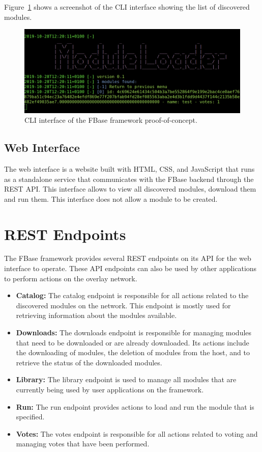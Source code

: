 Figure~\ref{fig:cli-interface} shows a screenshot of the CLI interface showing the list of discovered modules.

\begin{figure}[h!]
	\centering
	\includegraphics[width=\textwidth]{images/cli-interface.png}
	\caption{\label{fig:cli-interface} CLI interface of the FBase framework proof-of-concept.}
\end{figure}

\subsection{Web Interface}

The web interface is a website built with HTML, CSS, and JavaScript that runs as a standalone service that communicates with the FBase backend through the REST API. This interface allows to view all discovered modules, download them and run them. This interface does not allow a module to be created.

\section{REST Endpoints}

The FBase framework provides several REST endpoints on its API for the web interface to operate. These API endpoints can also be used by other applications to perform actions on the overlay network.

\begin{itemize}
	\item \textbf{Catalog:} The catalog endpoint is responsible for all actions related to the discovered modules on the network. This endpoint is mostly used for retrieving information about the modules available.
	\item \textbf{Downloads:} The downloads endpoint is responsible for managing modules that need to be downloaded or are already downloaded. Its actions include the downloading of modules, the deletion of modules from the host, and to retrieve the status of the downloaded modules.
	\item \textbf{Library:} The library endpoint is used to manage all modules that are currently being used by user applications on the framework.
	\item \textbf{Run:} The run endpoint provides actions to load and run the module that is specified.
	\item \textbf{Votes:} The votes endpoint is responsible for all actions related to voting and managing votes that have been performed.
\end{itemize}

